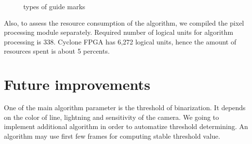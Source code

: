 \documentclass[a4paper,12pt]{article} %
\newcommand{\RomanNumeralCaps}[1]
{\MakeUppercase{\romannumeral #1}}
\begin{document}
\begin{figure}
\begin{minipage}[h]{0.49\linewidth}
	\end{minipage}
	\hfill
	\begin{minipage}[h]{0.49\linewidth}
	\end{minipage}
	
	\caption{types of guide marks}
	\label{fig:lines}
\end{figure}

Also, to assess the resource consumption of the algorithm, we compiled the pixel processing module separately. Required number of logical units for algorithm processing is 338. Cyclone \RomanNumeralCaps{4} FPGA has 6,272 logical units, hence the amount of resources spent is about 5 percents.




\section*{Future improvements}  

One of the main algorithm parameter is the threshold of binarization. It depends on the color of line, lightning and sensitivity of the camera. We going to implement additional algorithm in order to automatize threshold determining. An algorithm may use first few frames for computing stable threshold value. 
\end{document}
